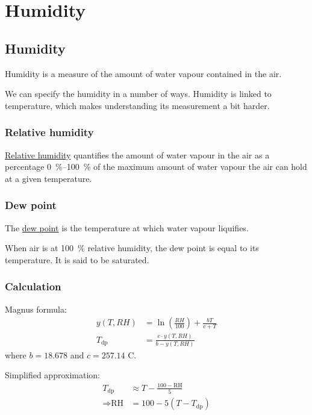 \chapter{Humidity}

\section{Humidity}

Humidity is a measure of the amount of water vapour contained in the air.

We can specify the humidity in a number of ways.
Humidity is linked to temperature, which makes understanding its measurement a bit harder.

\subsection{Relative humidity}

\href{https://en.wikipedia.org/wiki/Relative_humidity}{Relative humidity} quantifies the amount of water vapour in the air as a percentage \SIrange{0}{100}{\percent} of the maximum amount of water vapour the air can hold at a given temperature.

\subsection{Dew point}

The \href{https://en.wikipedia.org/wiki/Dew_point}{dew point} is the temperature at which water vapour liquifies.

When air is at \SI{100}{\percent} relative humidity, the dew point is equal to its temperature.
It is said to be saturated. 

\subsection{Calculation}

Magnus formula: 
\begin{align}
  y (T, RH) & = \ln \left ( \frac{RH}{100} \right ) + \frac{bT}{c+T} \\
  T_{\mbox{dp}} & = \frac{c \cdot y (T, RH)}{b - y(T, RH)}
\end{align}
where $b = 18.678$ and $c=257.14$ C. 

Simplified approximation:
\begin{align}
  T_{\mbox{dp}} & \approx T - \frac{100-\mbox{RH}}{5} \\
  \Rightarrow \mbox{RH} & = 100 - 5 ( T - T_{\mbox{dp}} ) 
\end{align}


